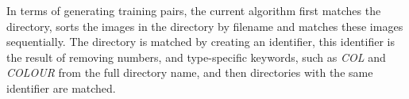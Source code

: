 In terms of generating training pairs, the current algorithm first matches the directory, sorts the images in the directory by filename and matches these images sequentially. The directory is matched by creating an identifier, this identifier is the result of removing numbers, and type-specific keywords, such as \textit{COL} and \textit{COLOUR} from the full directory name, and then directories with the same identifier are matched.







